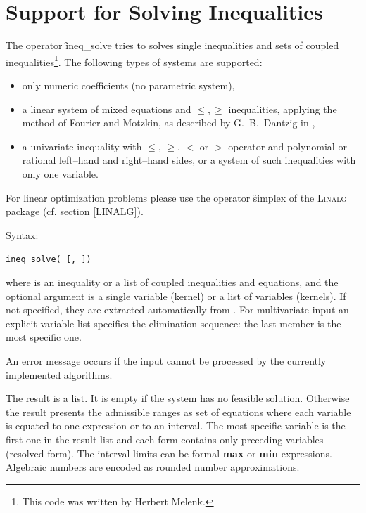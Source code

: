 \section{Support for Solving Inequalities}
\hypertarget{operator:INEQ_SOLVE}{}
The operator \f{ineq\_solve}
tries to solves single inequalities and sets of coupled inequalities\footnote{This code was written by Herbert Melenk.}.
The following types of systems are supported:
\begin{itemize}
\item only numeric coefficients (no parametric system),
\item a linear system of mixed equations and $\leq,\geq$
     inequalities, applying the method of Fourier and Motzkin, as described by G.~B.~Dantzig in \cite{Dantzig1963},
\item a univariate inequality with $\leq$, $\geq$, $<$ or $>$ operator
     and polynomial or rational left--hand and right--hand sides,
     or a system of such inequalities with only one variable.
\end{itemize}
For linear optimization problems please use the operator
\f{simplex} of the \textsc{Linalg} package (cf. section \ref{LINALG}).

Syntax:
\begin{syntax}
  \texttt{ineq\_solve( [,\,])}
\end{syntax}
where  is an inequality or a list of coupled inequalities
and equations, and the optional argument  is a single
variable (kernel) or a list of variables (kernels).  If not specified,
they are extracted automatically from .  For multivariate
input an explicit variable list specifies the elimination sequence:
the last member is the most specific one.

An error message occurs if the input cannot be processed by the
currently implemented algorithms.

The result is a list. It is empty if the system has no feasible solution.
Otherwise the result presents the admissible ranges as set
of equations where each variable is equated to
one expression or to an interval.
The most specific variable is the first one in the result list and
each form contains only preceding variables (resolved form).
The interval limits can be formal \textbf{max} or \textbf{min} expressions.
Algebraic numbers are encoded as rounded number approximations.

